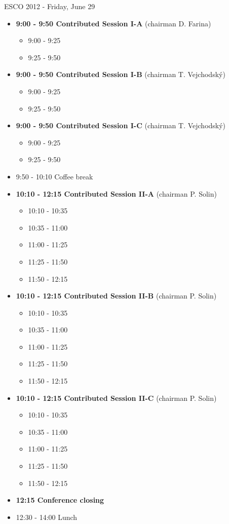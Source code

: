 \documentclass[10pt, A4]{article}%
\begin{document}
\newpage

\centerline{\huge ESCO 2012 - Friday, June 29}
\vspace{4mm}

\begin{itemize}    
  \item {\bf 9:00 - 9:50 Contributed Session I-A} (chairman D. Farina) 
  \begin{itemize}
    \item 9:00 - 9:25 
    \item 9:25 - 9:50 
  \end{itemize}
  \item {\bf 9:00 - 9:50 Contributed Session I-B} (chairman T. Vejchodsk\'y) 
  \begin{itemize}
    \item 9:00 - 9:25 
    \item 9:25 - 9:50 
  \end{itemize}
  \item {\bf 9:00 - 9:50 Contributed Session I-C} (chairman T. Vejchodsk\'y) 
  \begin{itemize}
    \item 9:00 - 9:25 
    \item 9:25 - 9:50 
  \end{itemize}
  \item 9:50 - 10:10 Coffee break
  \item {\bf 10:10 - 12:15 Contributed Session II-A} (chairman P. Solin) 
  \begin{itemize}
    \item 10:10 - 10:35 
    \item 10:35 - 11:00 
    \item 11:00 - 11:25 
    \item 11:25 - 11:50 
    \item 11:50 - 12:15 
  \end{itemize}
    \item {\bf 10:10 - 12:15 Contributed Session II-B} (chairman P. Solin) 
  \begin{itemize}
    \item 10:10 - 10:35 
    \item 10:35 - 11:00 
    \item 11:00 - 11:25 
    \item 11:25 - 11:50 
    \item 11:50 - 12:15 
  \end{itemize}
    \item {\bf 10:10 - 12:15 Contributed Session II-C} (chairman P. Solin) 
  \begin{itemize}
    \item 10:10 - 10:35 
    \item 10:35 - 11:00 
    \item 11:00 - 11:25 
    \item 11:25 - 11:50 
    \item 11:50 - 12:15 
  \end{itemize}
  \item {\bf 12:15 Conference closing}
  \item 12:30 - 14:00 Lunch
\end{itemize}
\end{document}
